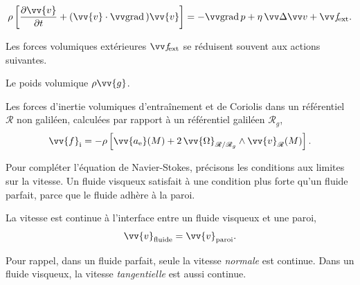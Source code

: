 \documentclass[12pt,fancy]{cours}
\begin{document}
\begin{theorem}\label{form:NS}
\begin{equation*}
\begin{split}
\rho\left[\dfrac{\partial \vv{v}}{\partial t}+(\vv{v}\cdot\grad)\vv{v}\right]=-\grad{p}+\eta\,\Deltav{v}+\fext.
\end{split}
\end{equation*}
\end{theorem}
Les forces volumiques extérieures $\fext$ se réduisent souvent aux actions suivantes.
\begin{liste}
\item Le poids volumique $\rho\vv{g}$.
\item  Les forces d'inertie volumiques d'entraînement et de Coriolis dans un référentiel $\mathcal{R}$ non galiléen, calculées  par rapport à un référentiel galiléen $\mathcal{R}_g$,
\begin{equation}
\begin{split}
\vv{f}_{\rm{i}} =	-\rho\left[\vv{a_{\rm{e}}}(M)+2\,\vv{\Omega}_{\mathcal{R}/\Rcal_g}\pv\vv{v}_{\mathcal{R}}(M)\right].
\end{split}
\end{equation}
\end{liste}

Pour compléter l’équation de Navier-Stokes, précisons les conditions aux limites sur la vitesse. Un fluide visqueux satisfait à une condition plus forte qu’un fluide parfait, parce que le fluide adhère à la paroi. %
\begin{prop}
La vitesse est continue à l’interface entre un fluide visqueux et une paroi,
\begin{equation*}
\begin{split}
\vv{v}_{\rm{fluide}}=\vv{v}_{\rm{paroi}}.
\end{split}
\end{equation*}
\end{prop}
\noindent Pour rappel, dans un fluide parfait, seule la vitesse \emph{normale} est continue. Dans un fluide visqueux, la vitesse \emph{tangentielle} est aussi continue.
\end{document}
